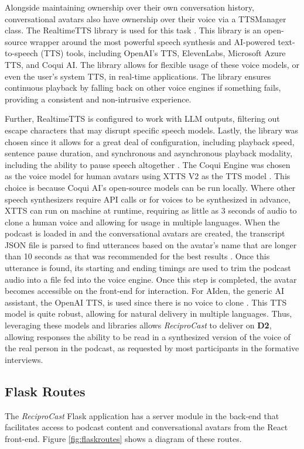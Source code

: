 \documentclass[12pt]{report}
\begin{document}
\begin{myfont}
        \indent Alongside maintaining ownership over their own conversation history, conversational avatars also have ownership over their voice via a TTSManager class. The RealtimeTTS library is used for this task \citep{RealtimeTTS}. This library is an open-source wrapper around the most powerful speech synthesis and AI-powered text-to-speech (TTS) tools, including OpenAI's TTS, ElevenLabs, Microsoft Azure TTS, and Coqui AI. The library allows for flexible usage of these voice models, or even the user's system TTS, in real-time applications. The library ensures continuous playback by falling back on other voice engines if something fails, providing a consistent and non-intrusive experience. 
        
        \indent Further, RealtimeTTS is configured to work with LLM outputs, filtering out escape characters that may disrupt specific speech models. Lastly, the library was chosen since it allows for a great deal of configuration, including playback speed, sentence pause duration, and synchronous and asynchronous playback modality, including the ability to pause speech altogether \citep{RealtimeTTS}. The Coqui Engine was chosen as the voice model for human avatars using XTTS V2 as the TTS model \citep{XTTS_Coqui}. This choice is because Coqui AI's open-source models can be run locally. Where other speech synthesizers require API calls or for voices to be synthesized in advance, XTTS can run on machine at runtime, requiring as little as 3 seconds of audio to clone a human voice and allowing for usage in multiple languages. When the podcast is loaded in and the conversational avatars are created, the transcript JSON file is parsed to find utterances based on the avatar's name that are longer than 10 seconds as that was recommended for the best results \citep{XTTS_Coqui}. Once this utterance is found, its starting and ending timings are used to trim the podcast audio into a file fed into the voice engine. Once this step is completed, the avatar becomes accessible on the front-end for interaction. For AIden, the generic AI assistant, the OpenAI TTS, is used since there is no voice to clone \citep{OpenAI_TTS}. This TTS model is quite robust, allowing for natural delivery in multiple languages. Thus, leveraging these models and libraries allows \textit{ReciproCast} to deliver on \textbf{D2}, allowing responses the ability to be read in a synthesized version of the voice of the real person in the podcast, as requested by most participants in the formative interviews. 

        \subsection{Flask Routes}
        \indent The \textit{ReciproCast} Flask application has a server module in the back-end that facilitates access to podcast content and conversational avatars from the React front-end. Figure \ref{fig:flaskroutes} shows a diagram of these routes.


\end{myfont}
\end{document}
